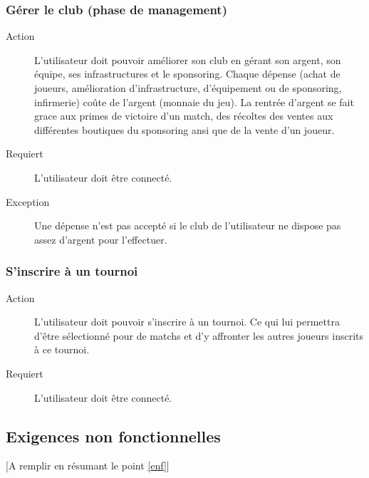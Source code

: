 \documentclass[a4paper]{article}
\begin{document}
\subsubsection{Gérer le club (phase de management)}
\begin{description}
\item[Action] L'utilisateur doit pouvoir améliorer son club en gérant son argent, son équipe, ses infrastructures et le sponsoring. Chaque dépense (achat de joueurs, amélioration d'infrastructure, d'équipement ou de sponsoring, infirmerie) coûte de l'argent (monnaie du jeu). La rentrée d'argent se fait grace aux primes de victoire d'un match, des récoltes des ventes aux différentes boutiques du sponsoring ansi que de la vente d'un joueur.
\item[Requiert] L'utilisateur doit être connecté.
\item[Exception] Une dépense n'est pas accepté si le club de l'utilisateur ne dispose pas assez d'argent pour l'effectuer.
\end{description}

\subsubsection{S'inscrire à un tournoi}
\begin{description}
\item[Action] L'utilisateur doit pouvoir s'inscrire à un tournoi.
Ce qui lui permettra d'être sélectionné pour de matchs et d'y affronter les autres joueurs inscrits à ce tournoi.
\item[Requiert] L'utilisateur doit être connecté.
\end{description} 


\subsection{Exigences non fonctionnelles}
[A remplir en résumant le point \ref{enf}]

\end{document}
